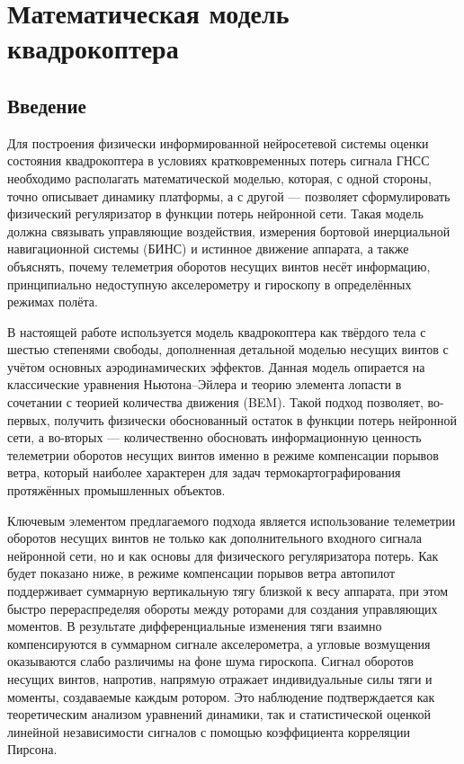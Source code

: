 
\chapter{Математическая модель квадрокоптера}
\label{ch:2}

\section{Введение}
\label{sec:intro_model}

Для построения физически информированной нейросетевой системы оценки состояния квадрокоптера в условиях кратковременных потерь сигнала ГНСС необходимо располагать математической моделью, которая, с одной стороны, точно описывает динамику платформы, а с другой — позволяет сформулировать физический регуляризатор в функции потерь нейронной сети. Такая модель должна связывать управляющие воздействия, измерения бортовой инерциальной навигационной системы (БИНС) и истинное движение аппарата, а также объяснять, почему телеметрия оборотов несущих винтов несёт информацию, принципиально недоступную акселерометру и гироскопу в определённых режимах полёта.

В настоящей работе используется модель квадрокоптера как твёрдого тела с шестью степенями свободы, дополненная детальной моделью несущих винтов с учётом основных аэродинамических эффектов. Данная модель опирается на классические уравнения Ньютона–Эйлера и теорию элемента лопасти в сочетании с теорией количества движения (BEM). Такой подход позволяет, во-первых, получить физически обоснованный остаток в функции потерь нейронной сети, а во-вторых — количественно обосновать информационную ценность телеметрии оборотов несущих винтов именно в режиме компенсации порывов ветра, который наиболее характерен для задач термокартографирования протяжённых промышленных объектов.

Ключевым элементом предлагаемого подхода является использование телеметрии оборотов несущих винтов не только как дополнительного входного сигнала нейронной сети, но и как основы для физического регуляризатора потерь. Как будет показано ниже, в режиме компенсации порывов ветра автопилот поддерживает суммарную вертикальную тягу близкой к весу аппарата, при этом быстро перераспределяя обороты между роторами для создания управляющих моментов. В результате дифференциальные изменения тяги взаимно компенсируются в суммарном сигнале акселерометра, а угловые возмущения оказываются слабо различимы на фоне шума гироскопа. Сигнал оборотов несущих винтов, напротив, напрямую отражает индивидуальные силы тяги и моменты, создаваемые каждым ротором. Это наблюдение подтверждается как теоретическим анализом уравнений динамики, так и статистической оценкой линейной независимости сигналов с помощью коэффициента корреляции Пирсона.

